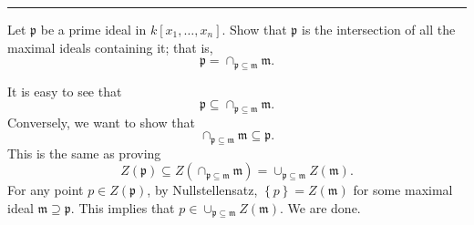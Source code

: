 \documentclass[letterpaper, 12pt]{article}
\begin{document}
\noindent\rule{7in}{2.8pt}
\begin{problem}{1.5}
Let \(\mathfrak{p}\) be a prime ideal in \(k[x_1,\ldots,x_n]\). Show that \(\mathfrak{p}\) is the intersection of all the maximal ideals containing it; that is,
\[\mathfrak{p}=\cap_{\mathfrak{p}\subseteq \mathfrak{m}}\mathfrak{m}.\]
\end{problem}
\begin{solution}
It is easy to see that 
\[\mathfrak{p}\subseteq\cap_{\mathfrak{p}\subseteq \mathfrak{m}}\mathfrak{m}.\]
Conversely, we want to show that 
\[\cap_{\mathfrak{p}\subseteq \mathfrak{m}}\mathfrak{m}\subseteq \mathfrak{p}.\]
This is the same as proving 
\[Z(\mathfrak{p})\subseteq Z(\cap_{\mathfrak{p}\subseteq \mathfrak{m}}\mathfrak{m})=\cup_{\mathfrak{p}\subseteq \mathfrak{m}}Z(\mathfrak{m}).\]
For any point \(p\in Z(\mathfrak{p})\), by Nullstellensatz, \(\left\{ p \right\}=Z(\mathfrak{m})\) for some maximal ideal \(\mathfrak{m}\supseteq \mathfrak{p}\). This implies that \(p\in \cup_{\mathfrak{p}\subseteq \mathfrak{m}}Z(\mathfrak{m})\). We are done. 
\end{solution}
\end{document}
